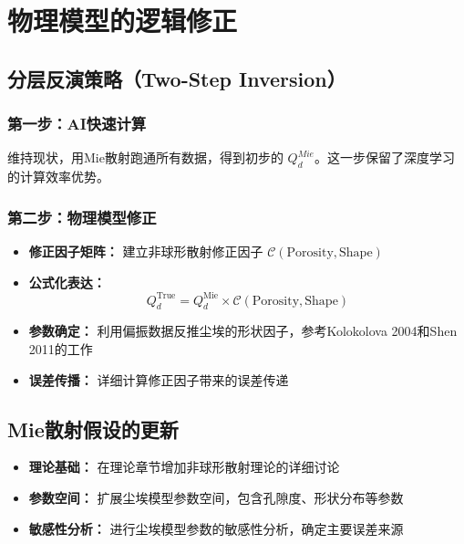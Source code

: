 \documentclass[12pt]{article}
\begin{document}
\section{物理模型的逻辑修正}

\subsection{分层反演策略（Two-Step Inversion）}

\subsubsection{第一步：AI快速计算}

维持现状，用Mie散射跑通所有数据，得到初步的 $Q_d^{Mie}$。这一步保留了深度学习的计算效率优势。

\subsubsection{第二步：物理模型修正}

\begin{itemize}[leftmargin=*]
\item \textbf{修正因子矩阵：} 建立非球形散射修正因子 $\mathcal{C}(\text{Porosity}, \text{Shape})$
\item \textbf{公式化表达：}
\begin{equation}
Q_d^{\text{True}} = Q_d^{\text{Mie}} \times \mathcal{C}(\text{Porosity}, \text{Shape})
\end{equation}
\item \textbf{参数确定：} 利用偏振数据反推尘埃的形状因子，参考Kolokolova 2004和Shen 2011的工作
\item \textbf{误差传播：} 详细计算修正因子带来的误差传递
\end{itemize}

\subsection{Mie散射假设的更新}

\begin{itemize}[leftmargin=*]
\item \textbf{理论基础：} 在理论章节增加非球形散射理论的详细讨论
\item \textbf{参数空间：} 扩展尘埃模型参数空间，包含孔隙度、形状分布等参数
\item \textbf{敏感性分析：} 进行尘埃模型参数的敏感性分析，确定主要误差来源
\end{itemize}
\end{document}
